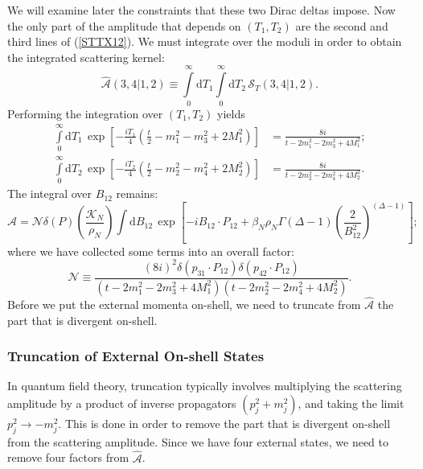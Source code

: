We will examine later the constraints that these two Dirac deltas impose. Now the only part of the amplitude that depends on $(T_{1}, T_{2})$ are the second and third lines of (\ref{STTX12}). We must integrate over the moduli in order to obtain the integrated scattering kernel:
\begin{equation}
	\widehat{\mathcal{A}}(3, 4| 1, 2) \equiv \int\limits_{0}^{\infty} \mathrm{d}T_{1} \int\limits_{0}^{\infty} \mathrm{d}T_{2} \, \mathcal{S}_{T}(3, 4| 1, 2).
\end{equation}
Performing the integration over $(T_{1}, T_{2})$ yields
\begin{align}
	\int\limits_{0}^{\infty} \mathrm{d}T_{1} \, \exp{\left[ -\frac{i T_{1}}{4} \left( \frac{t}{2} - m_{1}^{2} - m_{3}^{2} + 2 M_{1}^{2}\right) \right]} &= \frac{8i}{t - 2m_{1}^{2} - 2m_{3}^{2} + 4 M_{1}^{2}}; \\
	\int\limits_{0}^{\infty} \mathrm{d}T_{2} \, \exp{\left[ -\frac{i T_{2}}{4} \left( \frac{t}{2} - m_{2}^{2} - m_{4}^{2} + 2 M_{2}^{2}\right) \right]} &= \frac{8i}{t - 2m_{2}^{2} - 2m_{4}^{2} + 4 M_{2}^{2}}.
\end{align}
The integral over $B_{12}$ remains:
\begin{equation}
	\widehat{\mathcal{A}} = \mathcal{N} \delta(P) \left( \frac{\mathcal{K}_{N}}{\rho_{N}} \right) \int \mathrm{d}B_{12} \, \exp{\left[-i B_{12} \cdot P_{12} + \beta_{N} \rho_{N} \Gamma(\Delta - 1) \left( \frac{2}{B_{1 2}^{2}} \right)^{(\Delta - 1)} \right]}; \label{AHatN}
\end{equation}
where we have collected some terms into an overall factor:
\begin{equation}
	\mathcal{N} \equiv \frac{(8i)^{2} \delta(p_{31} \cdot P_{12}) \delta(p_{42} \cdot P_{12})}{(t - 2m_{1}^{2} - 2m_{3}^{2} + 4 M_{1}^{2})(t - 2m_{2}^{2} - 2m_{4}^{2} + 4 M_{2}^{2})}.
\end{equation}
Before we put the external momenta on-shell, we need to truncate from $\widehat{\mathcal{A}}$ the part that is divergent on-shell.
\subsubsection{Truncation of External On-shell States}
In quantum field theory, truncation typically involves multiplying the scattering amplitude by a product of inverse propagators $(p_{j}^{2} + m_{j}^{2})$, and taking the limit $p_{j}^{2} \rightarrow - m_{j}^{2}$. This is done in order to remove the part that is divergent on-shell from the scattering amplitude. Since we have four external states, we need to remove four factors from $\widehat{\mathcal{A}}$.

